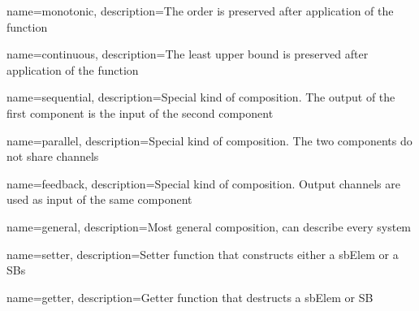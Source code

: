 {
    name=monotonic,
    description={The order is preserved after application of the function}
}

{
    name=continuous,
    description={The least upper bound is preserved after application of the function}
}


{
    name=sequential,
    description={Special kind of composition. The output of the first component is the input of the second component}
}

{
    name=parallel,
    description={Special kind of composition. The two components do not share channels}
}

{
    name=feedback,
    description={Special kind of composition. Output channels are used as input of the same component}
}

{
    name=general,
    description={Most general composition, can describe every system}
}

{
    name=setter,
    description={Setter function that constructs either a sbElem or a SBs}
}

{
    name=getter,
    description={Getter function that destructs a sbElem or SB}
}

